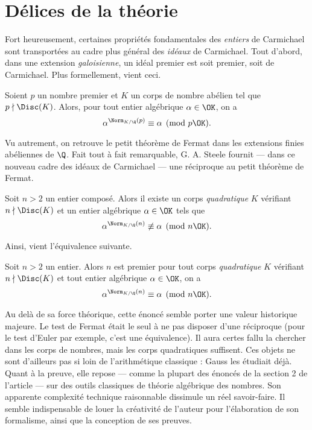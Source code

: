 \section{Délices de la théorie}

Fort heureusement, certaines propriétés fondamentales des \emph{entiers} de Carmichael sont transportées au cadre plus général des \emph{idéaux} de Carmichael. Tout d'abord, dans une extension \emph{galoisienne}, un idéal premier est soit premier, soit de Carmichael. Plus formellement, vient ceci.
\begin{theoreme}
	Soient $p$ un nombre premier et $K$ un corps de nombre abélien tel que $p\nmid \Disc(K)$. Alors, pour tout entier algébrique $\alpha \in \OK$, on a $$\alpha^{\Norm_{K/\Q}(p)} \equiv \alpha \pmod{p\OK}.$$
\end{theoreme}

Vu autrement, on retrouve le petit théorème de Fermat dans les extensions finies abéliennes de $\Q$. Fait tout à fait remarquable, G. A. Steele fournit — dans ce nouveau cadre des idéaux de Carmichael — une réciproque au petit théorème de Fermat.

\begin{theoreme}
	Soit $n>2$ un entier composé. Alors il existe un corps \emph{quadratique} $K$ vérifiant $n\nmid \Disc(K)$ et un entier algébrique $\alpha \in \OK$ tels que $$\alpha^{\Norm_{K/\Q}(n)} \not\equiv \alpha \pmod{n\OK}.$$
\end{theoreme}

Ainsi, vient l'équivalence suivante.

\begin{theoreme}\label{ptf—reciproque}
	Soit $n>2$ un entier. Alors $n$ est premier \ssi pour tout corps \emph{quadratique} $K$ vérifiant $n\nmid \Disc(K)$ et tout entier algébrique $\alpha \in \OK$, on a $$\alpha^{\Norm_{K/\Q}(n)} \equiv \alpha \pmod{n\OK}.$$
\end{theoreme}

Au delà de sa force théorique, cette énoncé semble porter une valeur historique majeure. Le test de Fermat était le seul à ne pas disposer d'une réciproque (pour le test d'Euler par exemple, c'est une équivalence). Il aura certes fallu la chercher dans les corps de nombres, mais les corps quadratiques suffisent. Ces objets ne sont d'ailleurs pas si loin de l'arithmétique classique : Gauss les étudiait déjà. Quant à la preuve, elle repose — comme la plupart des énoncés de la section 2 de l'article — sur des outils classiques de théorie algébrique des nombres. Son apparente complexité technique raisonnable dissimule un réel savoir-faire. Il semble indispensable de louer la créativité de l'auteur pour l'élaboration de son formalisme, ainsi que la conception de ses preuves. \\

